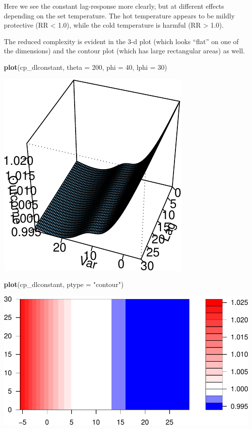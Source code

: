 \documentclass[
]{book}
\newenvironment{Shaded}{\begin{snugshade}}{\end{snugshade}}
\newcommand{\DataTypeTok}[1]{\textcolor[rgb]{0.13,0.29,0.53}{#1}}
\newcommand{\DecValTok}[1]{\textcolor[rgb]{0.00,0.00,0.81}{#1}}
\newcommand{\KeywordTok}[1]{\textcolor[rgb]{0.13,0.29,0.53}{\textbf{#1}}}
\newcommand{\NormalTok}[1]{#1}
\newcommand{\StringTok}[1]{\textcolor[rgb]{0.31,0.60,0.02}{#1}}
\begin{document}
Here we see the constant lag-response more clearly, but at different effects depending on the set temperature. The hot temperature appears to be mildly protective (RR \textless{} 1.0), while the cold temperature is harmful (RR \textgreater{} 1.0).

The reduced complexity is evident in the 3-d plot (which looks ``flat'' on one of the dimensions) and the contour plot (which has large rectangular areas) as well.

\begin{Shaded}
\begin{Highlighting}[]
\KeywordTok{plot}\NormalTok{(cp_dlconstant, }\DataTypeTok{theta =} \DecValTok{200}\NormalTok{, }\DataTypeTok{phi =} \DecValTok{40}\NormalTok{, }\DataTypeTok{lphi =} \DecValTok{30}\NormalTok{)}
\end{Highlighting}
\end{Shaded}

\includegraphics{adv_epi_analysis_files/figure-latex/unnamed-chunk-113-1.pdf}

\begin{Shaded}
\begin{Highlighting}[]
\KeywordTok{plot}\NormalTok{(cp_dlconstant, }\DataTypeTok{ptype =} \StringTok{"contour"}\NormalTok{)}
\end{Highlighting}
\end{Shaded}

\includegraphics{adv_epi_analysis_files/figure-latex/unnamed-chunk-113-2.pdf}
\end{document}
